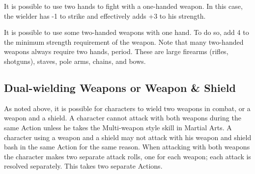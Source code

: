 \documentclass[twoside]{book}
\begin{document}
    {  
    It is possible to use two hands to fight with a
               one-handed weapon. In this case, the wielder has -1 to
               strike and effectively adds +3 to his strength. 
    }
  
    {  
    It is possible to use some two-handed weapons with
               one hand. To do so, add 4 to the minimum strength
               requirement of the weapon. Note that many two-handed
               weapons always require two hands, period. These are large
               firearms (rifles, shotguns), staves, pole arms, chains,
               and bows. 
    }
  
    

\subsection{Dual-wielding Weapons or Weapon \& Shield}
    
    {  
    As noted above, it is possible for characters to
               wield two weapons in combat, or a weapon and a shield. A
               character cannot attack with both weapons during the same
               Action unless he takes the Multi-weapon style skill in
               Martial Arts. A character using a weapon and a shield may
               not attack with his weapon and shield bash in the same
               Action for the same reason. When attacking with both
               weapons the character makes two separate attack rolls, one
               for each weapon; each attack is resolved separately. This
               takes two separate Actions. 
    }
  
\end{document}
